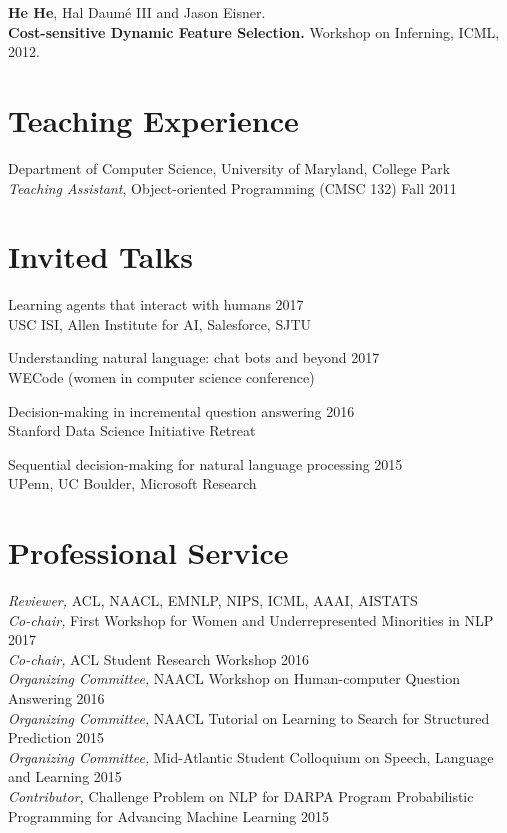 \documentclass[margin,line]{resume}
\begin{document}
\begin{resume}
{\bf He He}, Hal Daum\'e III and Jason Eisner.\\
{\bf Cost-sensitive Dynamic Feature Selection.}
Workshop on Inferning, ICML, 2012.

\section{\sc Teaching Experience} 
Department of Computer Science, University of Maryland, College Park\\
\emph{Teaching Assistant}, Object-oriented Programming (CMSC 132) \hfill Fall 2011
  

\section{\sc Invited Talks}
Learning agents that interact with humans \hfill 2017\\
USC ISI, Allen Institute for AI, Salesforce, SJTU

Understanding natural language: chat bots and beyond \hfill 2017\\
WECode (women in computer science conference)

Decision-making in incremental question answering \hfill 2016\\
Stanford Data Science Initiative Retreat

Sequential decision-making for natural language processing \hfill 2015\\
UPenn, UC Boulder, Microsoft Research

\section{\sc Professional Service}
\emph{Reviewer,} ACL, NAACL, EMNLP, NIPS, ICML, AAAI, AISTATS\\
\emph{Co-chair,} First Workshop for Women and Underrepresented Minorities in NLP \hfill 2017\\
\emph{Co-chair,} ACL Student Research Workshop \hfill 2016\\
\emph{Organizing Committee,} NAACL Workshop on Human-computer Question Answering \hfill 2016\\
\emph{Organizing Committee,} NAACL Tutorial on Learning to Search for Structured Prediction \hfill 2015\\
\emph{Organizing Committee,} Mid-Atlantic Student Colloquium on Speech, Language and Learning \hfill 2015\\
\emph{Contributor,} Challenge Problem on NLP for DARPA Program Probabilistic Programming for Advancing Machine Learning \hfill 2015\\

\end{resume}
\end{document}
